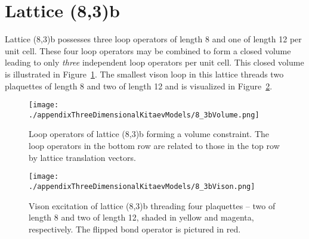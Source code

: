 \section{Lattice (8,3)b}
\label{appendix:ThreeDimensionalKitaevModels_8_3b}
%
%
Lattice (8,3)b possesses three loop operators of length 8 and one of length 12 per unit cell.
These four loop operators may be combined to form a closed volume leading to only \textit{three} independent loop operators per unit cell.
This closed volume is illustrated in Figure~\ref{fig:appendix_8_3bVolume}.
The smallest vison loop in this lattice threads two plaquettes of length 8 and two of length 12 and is visualized in Figure~\ref{fig:appendix_8_3bVison}.
%
\begin{figure}[ht!]
	\centering
	\texttt{[image: ./appendixThreeDimensionalKitaevModels/8\_3bVolume.png]}
	\caption{
		Loop operators of lattice (8,3)b forming a volume constraint.
		The loop operators in the bottom row are related to those in the top row by lattice translation vectors.
	}
	\label{fig:appendix_8_3bVolume}
\end{figure}
%
%
\begin{figure}[ht!]
	\centering
	\texttt{[image: ./appendixThreeDimensionalKitaevModels/8\_3bVison.png]}
	\caption{
		Vison excitation of lattice (8,3)b threading four plaquettes -- two of length 8 and two of length 12, shaded in yellow and magenta, respectively.
		The flipped bond operator is pictured in red.
	}
	\label{fig:appendix_8_3bVison}
\end{figure}
%


%
%
